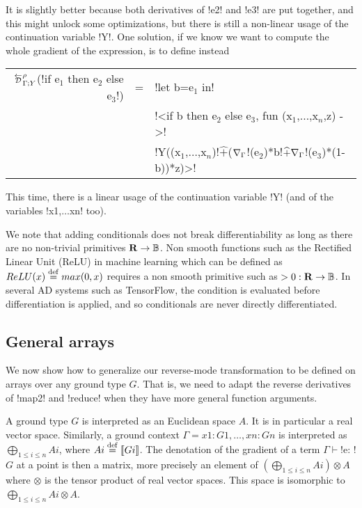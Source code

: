 It is slightly better because both derivatives of !e2! and !e3! are put together, and this might unlock some optimizations, 
but there is still a non-linear usage of the continuation variable !Y!.
One solution, if we know we want to compute the whole gradient of the expression, is to define instead

\begin{tabular}{r c l}
    $\directD{\rho}{\Gamma}{Y}$(!if e$_1$ then e$_2$ else e$_3$!) 
    &=& !let b=e$_1$ in!   \\
    && !<if b then e$_2$ else e$_3$, fun (x$_1$,$\ldots$,x$_n$,z) ->! \\
    && !Y((x$_1$,$\ldots$,x$_n$)!$\widehat{+}$($\nabla_\Gamma$!(e$_2$)*b!$\widehat{+}\nabla_\Gamma$!(e$_3$)*(1-b))*z)>!\\
\end{tabular}

This time, there is a linear usage of the continuation variable !Y! (and of the variables !x1,$\ldots$xn! too).

We note that adding conditionals does not break differentiability as long as there are no non-trivial primitives $\mathbf{R}\to\mathbb{B}$.
Non smooth functions such as the Rectified Linear Unit (ReLU) in machine learning which can be defined as $ReLU(x)\stackrel {\mathrm{def}}= max(0,x)$ 
requires a non smooth primitive such as $>0: \mathbf{R}\to\mathbb{B}$. In several AD systems such as TensorFlow, 
the condition is evaluated before differentiation is applied, and so conditionals are never directly differentiated.

\subsection{General arrays} %
\label{sub:Adding general arrays}

We now show how to generalize our reverse-mode transformation to be defined on arrays over any ground type $G$.
That is, we need to adapt the reverse derivatives of !map2! and !reduce! when they have more general function arguments.

A ground type $G$ is interpreted as an Euclidean space $A$. 
It is in particular a real vector space.
Similarly, a ground context $\Gamma=x1:G1,\ldots,xn:Gn$ is interpreted as $\bigoplus_{1\leq i\leq n}Ai$, where $Ai\stackrel {\mathrm{def}}=\llbracket Gi\rrbracket$.
The denotation of the gradient of a term $\Gamma \vdash$!e: !$G$ at a point is then a matrix, more precisely an element of $(\bigoplus_{1\leq i\leq n}Ai)\otimes A$
where $\otimes$ is the tensor product of real vector spaces. This space is isomorphic to $\bigoplus_{1\leq i\leq n}Ai\otimes A$.

